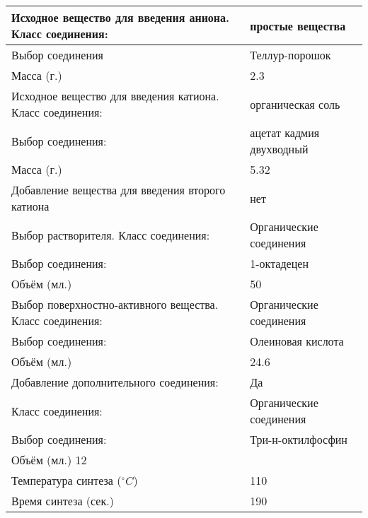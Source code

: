 \begin{enumerate}
    \begin{table}[H]
        \begin{center}
            \begin{tabular}{|p{9cm}|p{4cm}|}
                \hline
                Исходное вещество для введения аниона. Класс соединения:	&простые вещества \\
                \hline
                Выбор соединения	&Теллур-порошок \\
                \hline
                Масса (г.)&	2.3 \\
                \hline
                Исходное вещество для введения катиона. Класс соединения:&	органическая соль \\
                \hline
                Выбор соединения:	&ацетат кадмия двухводный \\
                \hline
                Масса (г.)&	5.32 \\
                \hline
                Добавление вещества для введения второго катиона	&нет \\
                \hline
                Выбор растворителя. Класс соединения:&	Органические соединения \\
                \hline
                Выбор соединения:	&1-октадецен \\
                \hline
                Объём (мл.)&	50 \\
                \hline
                Выбор поверхностно-активного вещества. Класс соединения:	&Органические соединения \\
                \hline
                Выбор соединения:	&Олеиновая кислота \\
                \hline
                Объём (мл.)	&24.6 \\
                \hline
                Добавление дополнительного соединения:&	Да \\
                \hline
                Класс соединения:	&Органические соединения \\
                \hline
                Выбор соединения:	&Три-н-октилфосфин \\
                \hline
                Объём (мл.)	12 \\
                \hline
                Температура синтеза ($^\circ C$)	&110 \\
                \hline
                Время синтеза (сек.)&	190 \\
                \hline
            \end{tabular}
        \end{center}
    \end{table}
    

\end{enumerate}
